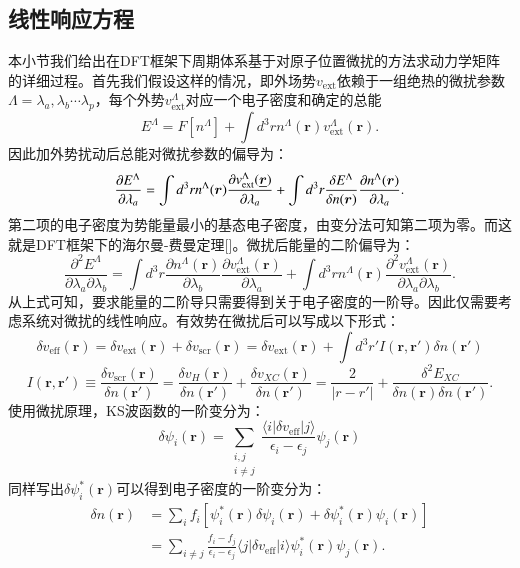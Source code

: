 \documentclass[phd,nobackinfo]{scutthesis}
\begin{document}
\subsection{线性响应方程}
本小节我们给出在DFT框架下周期体系基于对原子位置微扰的方法求动力学矩阵的详细过程。首先我们假设这样的情况，即外场势$v_{\mathrm{ext}}$依赖于一组绝热的微扰参数$\Lambda={\lambda_a,\lambda_b \cdots \lambda_p}$，每个外势$v_{\mathrm{ext}}^\Lambda$对应一个电子密度和确定的总能
\begin{equation}
  E^\Lambda = F[n^\Lambda]+\int d^3 r n^\Lambda (\bm{r})v_\mathrm{ext}^\Lambda (\bm{r}).
\end{equation}
因此加外势扰动后总能对微扰参数的偏导为：
\begin{equation}
  \frac{\partial E^\Lambda}{\partial \lambda_a} =
  \int d^3 r n^\Lambda(\bm{r})\frac{\partial v^\Lambda_\mathrm{ext}(\underline{\bm{r}})}{\partial \lambda_a} +
  \int d^3 r \frac{\delta E^\Lambda}{\delta n(\bm{r})} \frac{\partial n^\Lambda(\bm{r})}{\partial \lambda_a}.
\end{equation}
第二项的电子密度为势能量最小的基态电子密度，由变分法可知第二项为零。而这就是DFT框架下的海尔曼-费曼定理[]。微扰后能量的二阶偏导为：
\begin{equation}\label{eq:second_order_energy}
  \frac{\partial^2 E^\Lambda}{\partial\lambda_a\partial\lambda_b} =
  \int d^3 r\frac{\partial n^\Lambda(\bm{r})}{\partial\lambda_b}\frac{\partial v^\Lambda_\mathrm{ext}(\bm{r})}{\partial\lambda_a} +
  \int d^3 r n^\Lambda(\bm{r})\frac{\partial^2 v^\Lambda_\mathrm{ext}(\bm{r})}{\partial\lambda_a\partial\lambda_b}.
\end{equation}
从上式可知，要求能量的二阶导只需要得到关于电子密度的一阶导。因此仅需要考虑系统对微扰的线性响应。有效势在微扰后可以写成以下形式：
\begin{equation}
  \delta v_{\mathrm{eff}}(\bm{r}) = \delta v_\mathrm{ext}(\bm{r}) + \delta v_\mathrm{scr}(\bm{r}) =
  \delta v_\mathrm{ext}(\bm{r}) + \int d^3 r' I(\bm{r},\bm{r'})\delta n(\bm{r'})
\end{equation}
\begin{equation}
  I(\bm{r},\bm{r'}) \equiv \frac{\delta v_\mathrm{scr}(\bm{r})}{\delta n(\bm{r'})} = \frac{\delta v_H(\bm{r})}{\delta n(\bm{r'})} +
  \frac{\delta v_{XC}(\bm{r})}{\delta n(\bm{r'})} =
  \frac{2}{|r-r'|} + \frac{\delta^2 E_{XC}}{\delta n(\bm{r}) \delta n(\bm{r'})}.
\end{equation}
使用微扰原理，KS波函数的一阶变分为：
\begin{equation}
  \delta \psi_i(\bm{r}) = \sum_{\substack{i,j\\i\neq j}} \frac{\langle i |\delta v_{\mathrm{eff}}|j \rangle}{\epsilon_i-\epsilon_j} \psi_j(\bm{r})
\end{equation}
同样写出$\delta \psi_i^*(\bm{r})$可以得到电子密度的一阶变分为：
\begin{align}
  \delta n(\bm{r}) &= \sum_i f_i [\psi_i^*(\bm{r})\delta \psi_i(\bm{r}) + \delta \psi_i^*(\bm{r}) \psi_i(\bm{r})] \\
  &= \sum_{i\neq j} \frac{f_i-f_j}{\epsilon_i-\epsilon_j} \langle j| \delta v_\mathrm{eff} | i \rangle \psi_i^*(\bm{r}) \psi_j(\bm{r}).
\end{align}
\end{document}
